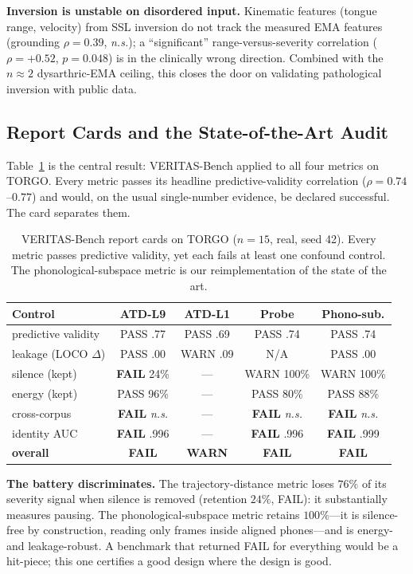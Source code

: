 \documentclass[runningheads]{llncs}
\newcommand{\ns}{\textit{n.s.}}
\begin{document}
\textbf{Inversion is unstable on disordered input.} Kinematic features (tongue
range, velocity) from SSL inversion do not track the measured EMA features
(grounding $\rho{=}0.39$, \ns); a ``significant'' range-versus-severity correlation
($\rho{=}+0.52$, $p{=}0.048$) is in the clinically wrong direction. Combined with the
$n{\approx}2$ dysarthric-EMA ceiling, this closes the door on validating pathological
inversion with public data.

\subsection{Report Cards and the State-of-the-Art Audit}
Table~\ref{tab:cards} is the central result: VERITAS-Bench applied to all four
metrics on TORGO. Every metric passes its headline predictive-validity correlation
($\rho{=}0.74$--$0.77$) and would, on the usual single-number evidence, be declared
successful. The card separates them.

\begin{table}[t]
\centering
\caption{VERITAS-Bench report cards on TORGO ($n{=}15$, real, seed 42). Every metric
passes predictive validity, yet each fails at least one confound control. The
phonological-subspace metric is our reimplementation of the state of the art.}
\label{tab:cards}
\begin{tabular}{lcccc}
\toprule
Control & ATD-L9 & ATD-L1 & Probe & Phono-sub. \\
\midrule
predictive validity      & PASS .77 & PASS .69 & PASS .74 & PASS .74 \\
leakage (LOCO $\Delta$)  & PASS .00 & WARN .09 & N/A      & PASS .00 \\
silence (kept)           & \textbf{FAIL} 24\% & --- & WARN 100\% & WARN 100\% \\
energy (kept)            & PASS 96\% & --- & PASS 80\% & PASS 88\% \\
cross-corpus             & \textbf{FAIL} \ns & --- & \textbf{FAIL} \ns & \textbf{FAIL} \ns \\
identity AUC             & \textbf{FAIL} .996 & --- & \textbf{FAIL} .996 & \textbf{FAIL} .999 \\
\midrule
\textbf{overall}         & \textbf{FAIL} & \textbf{WARN} & \textbf{FAIL} & \textbf{FAIL} \\
\bottomrule
\end{tabular}
\end{table}

\textbf{The battery discriminates.} The trajectory-distance metric loses $76\%$ of
its severity signal when silence is removed (retention $24\%$, FAIL): it substantially
measures pausing. The phonological-subspace metric retains $100\%$---it is
silence-free by construction, reading only frames inside aligned phones---and is
energy- and leakage-robust. A benchmark that returned FAIL for everything would be a
hit-piece; this one certifies a good design where the design is good.
\end{document}
